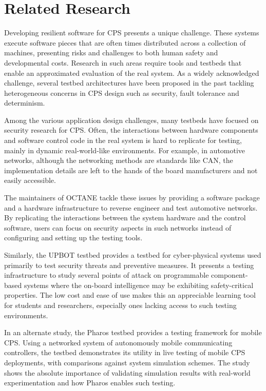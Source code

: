 \section{Related Research}

Developing resilient software for CPS presents a unique challenge. These systems execute software pieces that are often times distributed across a collection of machines, presenting risks and challenges to both human safety and developmental costs. Research in such areas require tools and testbeds that enable an approximated evaluation of the real system. As a widely acknowledged challenge, several testbed architectures have been proposed in the past tackling heterogeneous concerns in CPS design such as security, fault tolerance and determinism. 

Among the various application design challenges, many testbeds have focused on security research for CPS. Often, the interactions between hardware components and software control code in the real system is hard to replicate for testing, mainly in dynamic real-world-like environments. For example, in automotive networks, although the networking methods are standards like CAN, the implementation details are left to the hands of the board manufacturers and not easily accessible. 

The maintainers of OCTANE \cite{OCTANE} tackle these issues by providing a software package and a hardware infrastructure to reverse engineer and test automotive networks. By replicating the interactions between the system hardware and the control software, users can focus on security aspects in such networks instead of configuring and setting up the testing tools.

Similarly, the UPBOT \cite{UPBOT} testbed provides a testbed for cyber-physical systems used primarily to test security threats and preventive measures. It presents a testing infrastructure to study several points of attack on programmable component-based systems where the on-board intelligence may be exhibiting safety-critical properties. The low cost and ease of use makes this an appreciable learning tool for students and researchers, especially ones lacking access to such testing environments. 

In an alternate study, the Pharos \cite{Pharos} testbed provides a testing framework for mobile CPS. Using a networked system of autonomously mobile communicating controllers, the testbed demonstrates its utility in live testing of mobile CPS deployments, with comparisons against system simulation schemes. The study shows the absolute importance of validating simulation results with real-world experimentation and how Pharos enables such testing. 